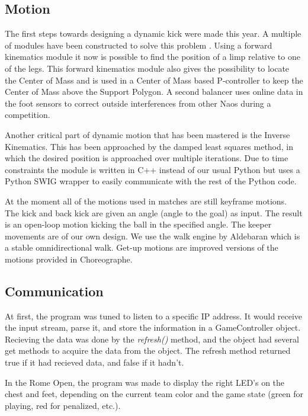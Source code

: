 \documentclass[a4paper]{article}
\begin{document}
\subsection{Motion}
The first steps towards designing a dynamic kick were made this year. A multiple of
modules have been constructed to solve this problem \cite{Becht2012}.
Using a  forward kinematics module it now is possible to 
find the position of a limp relative to one of the legs. This forward
kinematics module also gives the possibility to locate the Center of Mass and
is used in a Center of Mass based P-controller to keep the Center of Mass above the
Support Polygon. A second balancer uses online data in the foot sensors to correct outside interferences from other Naos during a competition. 

Another critical part of dynamic motion that has been mastered is the Inverse Kinematics. This has been approached by the damped least squares method, in which the desired position is approached over multiple iterations. Due to time constraints the module is written in C++ instead of our usual Python but uses a Python SWIG wrapper to easily communicate with the rest of the Python code.
 
At the moment all of the motions used in matches are still keyframe motions. The kick and back kick are given an angle (angle to the goal) as input. The result is an open-loop motion kicking the ball in the specified angle. The keeper movements are of our own design. We use the walk engine by Aldebaran which is a stable omnidirectional walk. Get-up motions are improved versions of the motions provided in Choreographe.


\subsection{Communication}
\label{sec:communication}
At first, the program was tuned to listen to a specific IP address. It would receive the input stream, parse it, and store the information in a GameController object. Recieving the data was done by the \textit{refresh()} method, and the object had several get methods to acquire the data from the object. The refresh method returned true if it had recieved data, and false if it hadn't.

In the Rome Open, the program was made to display the right LED’s on the chest and feet, depending on the current team color and the game state (green for playing, red for penalized, etc.). 
\end{document}

